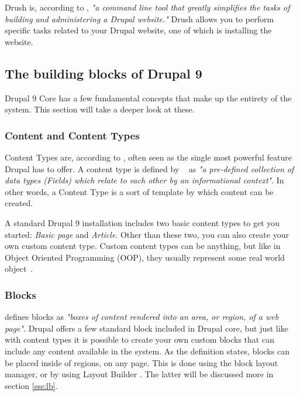 Drush is, according to \textcite{Tomlinson2015}, \emph{"a command line tool that greatly simplifies the tasks of building and administering a Drupal website."} Drush allows you to perform specific tasks related to your Drupal website, one of which is installing the website.


\subsection{The building blocks of Drupal 9}

Drupal 9 Core has a few fundamental concepts that make up the entirety of the system. This section will take a deeper look at these.

\subsubsection{Content and Content Types}

Content Types are, according to \textcite{Tomlinson2015}, often seen as the single most powerful feature Drupal has to offer. A content type is defined by ~\textcite{Drupal2021} as \emph{"a pre-defined collection of data types (Fields) which relate to each other by an informational context"}. In other words, a Content Type is a sort of template by which content can be created.

A standard Drupal 9 installation includes two basic content types to get you started: \emph{Basic page} and \emph{Article}. Other than these two, you can also create your own custom content type. Custom content types can be anything, but like in Object Oriented Programming (\gls{OOP}), they usually represent some real world object~\autocite{Tomlinson2015}.

\subsubsection{Blocks}
\label{sss:blocks}

\textcite{Drupal2021} defines blocks as \emph{"boxes of content rendered into an area, or region, of a web page"}. Drupal offers a few standard block included in Drupal core, but just like with content types it is possible to create your own custom blocks that can include any content available in the system. As the definition states, blocks can be placed inside of regions, on any page. This is done using the block layout manager, or by using Layout Builder \autocite{Tomlinson2015}. The latter will be discussed more in section \ref{sss:lb}.

